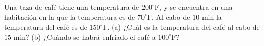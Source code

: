 \item Una taza de café tiene una temperatura de $200^\circ\text{F}$, y se encuentra en una habitación en la que la temperatura es de $70^\circ\text{F}$. Al cabo de $10 \text{ min}$ la temperatura del café es de $150^\circ\text{F}$. (a) ¿Cuál es la temperatura del café al cabo de $15 \text{ min}$? (b) ¿Cuándo se habrá enfriado el café a $100^\circ\text{F}$?
